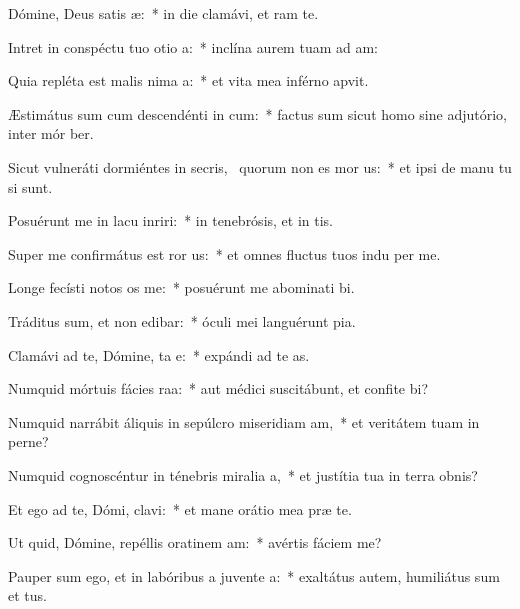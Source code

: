 \item Dómine, Deus satis æ:~* in die clamávi, et  ram te.
\item Intret in conspéctu tuo otio a:~* inclína aurem tuam ad  am:
\item Quia repléta est malis nima a:~* et vita mea inférno apvit.
\item Æstimátus sum cum descendénti in cum:~* factus sum sicut homo sine adjutório, inter mór ber.
\item Sicut vulneráti dormiéntes in secris,~\pscross{} quorum non es mor us:~* et ipsi de manu tu si sunt.
\item Posuérunt me in lacu inriri:~* in tenebrósis, et in  tis.
\item Super me confirmátus est ror us:~* et omnes fluctus tuos indu per me.
\item Longe fecísti notos os  me:~* posuérunt me abominati bi.
\item Tráditus sum, et non edibar:~* óculi mei languérunt  pia.
\item Clamávi ad te, Dómine, ta e:~* expándi ad te  as.
\item Numquid mórtuis fácies raa:~* aut médici suscitábunt, et confite bi?
\item Numquid narrábit áliquis in sepúlcro miseridiam am,~* et veritátem tuam in perne?
\item Numquid cognoscéntur in ténebris miralia a,~* et justítia tua in terra obnis?
\item Et ego ad te, Dómi, clavi:~* et mane orátio mea præ te.
\item Ut quid, Dómine, repéllis oratinem am:~* avértis fáciem   me?
\item Pauper sum ego, et in labóribus a juvente a:~* exaltátus autem, humiliátus sum et tus.
